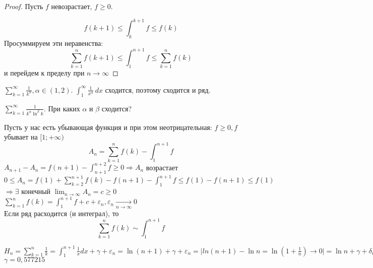 \begin{proof} 
	Пусть $f$ невозрастает, $f \geqslant 0$.

	\begin{figure}[H]
		\centering
		\def\svgwidth{.35\columnwidth}
		
	\end{figure}

	\[f(k + 1) \leqslant \int_{k}^{k + 1} f \leqslant f(k)\]
	Просуммируем эти неравенства:
	\[\sum_{k=1}^{n} f(k + 1) \leqslant \int_{1}^{n + 1} f \leqslant \sum_{k=1}^{n} f(k)\]
	и перейдем к пределу при $n \to \infty$ 
\end{proof}

\begin{Example}
	$\sum_{k=1}^{\infty} \frac{1}{k^\alpha}, \alpha \in (1, 2)$. $\int_{1}^{\infty} \frac{1}{x^\alpha}\,dx$ сходится, поэтому сходится и ряд.  
\end{Example}

\begin{Ex}
	$\sum_{k=1}^{\infty} \frac{1}{k^\alpha \ln^\beta k}$. При каких $\alpha$ и $\beta$ сходится? 
\end{Ex}

\begin{Rem}
	Пусть у нас есть убывающая функция и при этом неотрицательная: $f \geqslant 0, f$ убывает на $[1; + \infty)$\\
	$$A_n = \sum_{k=1}^{n} f(k) - \int_{1}^{n+1} f$$
	$A_{n+1} - A_n = f(n+1) - \int_{n+1}^{n+2} f \geqslant 0 \Rightarrow A_n$ возрастает\\
	$0 \leqslant A_n = f(1) + \sum_{k=2}^{n+1} f(k) - f(n+1) - \int_{1}^{n+1} f \leqslant f(1) - f(n+1) \leqslant f(1)$\\
	$\Rightarrow \exists$ конечный $\displaystyle \lim_{n \to \infty} A_n = c \geqslant 0$\\
	$\sum_{k=1}^{n} f(k) = \int_{1}^{n+1} f + c + \varepsilon_n, \varepsilon_n \underset{n \to \infty}{\to} 0$\\
	Если ряд расходится (и интеграл), то
	$$\sum_{k=1}^{n} f(k) \sim \int_{1}^{n+1} f$$
\end{Rem}

\begin{Example}
	$H_n = \sum_{k=1}^{n} \frac{1}{k} = \int_{1}^{n+1} \frac{1}{x}dx + \gamma + \varepsilon_n = 
	\ln (n+1) + \gamma + \varepsilon_n = \Bigg| ln(n+1) - \ln n = \ln (1 + \frac{1}{n}) \to 0 \Bigg| = \ln n + \gamma + \delta_n \Rightarrow H_n \sim \ln n$\\
	$\gamma = 0,577215$
\end{Example}

